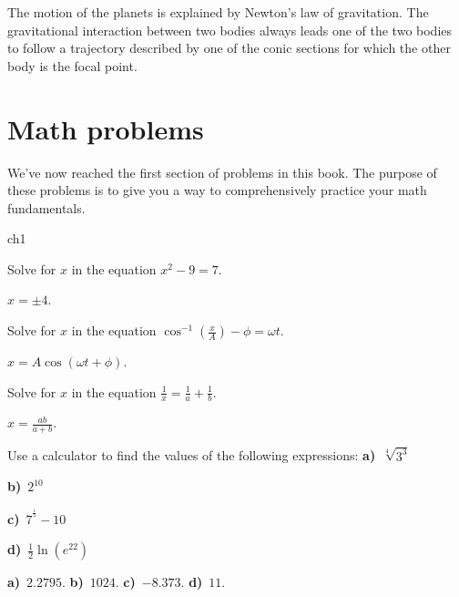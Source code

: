 		The motion of the planets is explained by Newton's law of gravitation.
		The gravitational interaction between two bodies always leads one of the two bodies to follow a trajectory described by one of the conic sections
		for which the other body is the focal point.


\section{Math problems}
\label{sec:math_problems}
	
	We've now reached the first section of problems in this book.
	The purpose of these problems is to give you a way to comprehensively practice your math fundamentals.

	
{\small 
	 
\begin{problems}{ch1}

	\vspace*{3mm}


		
	\begin{problem}
		Solve for $x$ in the equation $x^2-9=7$.
		\begin{answer}$x=\pm 4$.\end{answer}
	\end{problem}

	\begin{problem}
		Solve for $x$ in the equation $\cos^{-1}\!\left( \frac{x}{A} \right) - \phi = \omega t$.
		\begin{answer}$x=A\cos(\omega t+\phi)$.\end{answer}
	\end{problem}

	\begin{problem}		\label{mathprob:ch1:fractions2}
		Solve for $x$ in the equation $\frac{1}{x}=\frac{1}{a}+\frac{1}{b}$.	
		\begin{answer}$x=\frac{ab}{a+b}$.\end{answer}
	\end{problem}

	\begin{problem}
		Use a calculator to find the values of the following expressions:
		\fourcol
			\textbf{a)}~$\sqrt[4]{3^3}$
			
			\textbf{b)}~$2^{10}$
			
			\textbf{c)}~$7^{^{\frac{1}{4}}}-10$
			
			\textbf{d)}~$\frac{1}{2}\ln(e^{22})$
		\endfourcol
						\begin{answer}\textbf{a)}~$2.2795$.
					\textbf{b)}~$1024$.
					\textbf{c)}~$-8.373$.
					\textbf{d)}~$11$.\end{answer}
					\end{problem}



\end{problems}}
